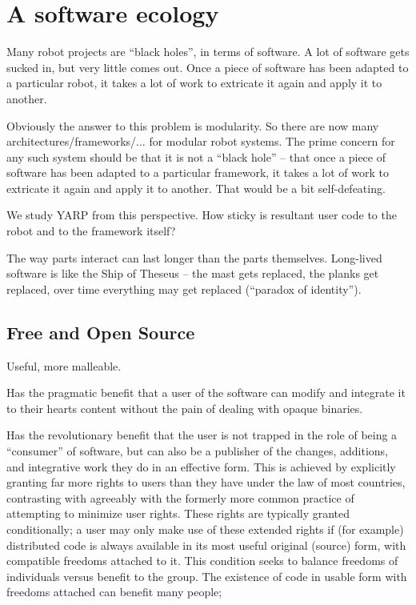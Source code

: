 


\section{A software ecology}

Many robot projects are ``black holes'', in terms of software.  A lot
of software gets sucked in, but very little comes out.  Once a piece
of software has been adapted to a particular robot, it takes a lot
of work to extricate it again and apply it to another.

Obviously the answer to this problem is modularity.  So there are 
now many architectures/frameworks/... for modular robot systems.
The prime concern for any such system should be that it is not
a ``black hole'' -- that once a piece of software has been adapted
to a particular framework, it takes a lot of work to extricate it
again and apply it to another.  That would be a bit self-defeating.

We study YARP from this perspective.  How sticky is resultant user
code to the robot and to the framework itself?


The way parts interact can last longer than the parts themselves.
Long-lived software is like the Ship of Theseus -- the mast gets replaced,
the planks get replaced, over time everything may get replaced (``paradox
of identity'').


\subsection{Free and Open Source}

Useful, more malleable.

Has the pragmatic benefit that a user of the software can
modify and integrate it to their hearts content without the 
pain of dealing with opaque binaries.

Has the revolutionary benefit that the user is not trapped in the role
of being a ``consumer'' of software, but can also be a publisher of
the changes, additions, and integrative work they do in an effective
form.  This is achieved by explicitly granting far more rights to
users than they have under the law of most countries, contrasting with
agreeably with the formerly more common practice of attempting to
minimize user rights.  These rights are typically granted
conditionally; a user may only make use of these extended rights if
(for example) distributed code is always available in its most useful
original (source) form, with compatible freedoms attached to it.  This
condition seeks to balance freedoms of individuals versus benefit to
the group.  The existence of code in usable form with freedoms 
attached can benefit many people;

